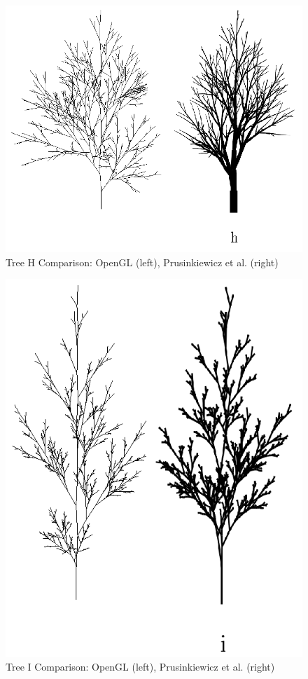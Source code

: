 \documentclass[final]{cmpreport}
\begin{document}
\begin{figure}[ht]
    \includegraphics[scale=0.4]{tree-comp-h.png} 
    \centering
    \captionsetup{justification=centering}
    \caption{Tree H Comparison: OpenGL (left), Prusinkiewicz et al. (right)}
    \label{fig:tree-comp-h}
\end{figure}

\begin{figure}[ht]
    \includegraphics[scale=0.4]{tree-comp-i.png} 
    \centering
    \captionsetup{justification=centering}
    \caption{Tree I Comparison: OpenGL (left), Prusinkiewicz et al. (right)}
    \label{fig:tree-comp-i}
\end{figure}
\end{document}

